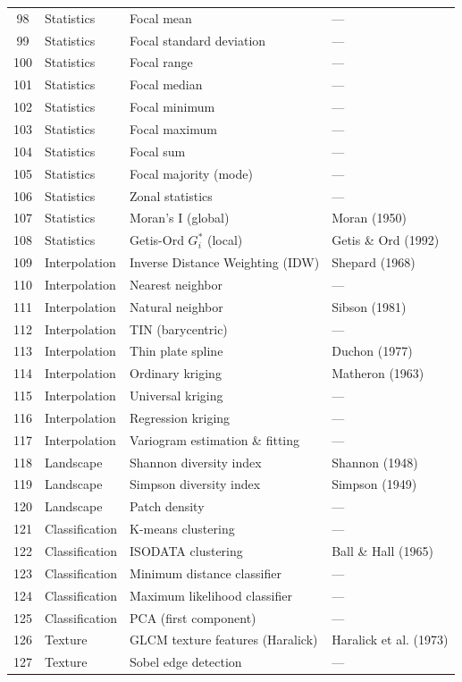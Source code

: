 \documentclass[11pt]{article}
\begin{document}
\begin{longtable}{@{}clp{5.5cm}p{4.5cm}@{}}
98  & Statistics & Focal mean & --- \\
99  & Statistics & Focal standard deviation & --- \\
100 & Statistics & Focal range & --- \\
101 & Statistics & Focal median & --- \\
102 & Statistics & Focal minimum & --- \\
103 & Statistics & Focal maximum & --- \\
104 & Statistics & Focal sum & --- \\
105 & Statistics & Focal majority (mode) & --- \\
106 & Statistics & Zonal statistics & --- \\
107 & Statistics & Moran's I (global) & Moran (1950) \\
108 & Statistics & Getis-Ord $G_i^*$ (local) & Getis \& Ord (1992) \\

109 & Interpolation & Inverse Distance Weighting (IDW) & Shepard (1968) \\
110 & Interpolation & Nearest neighbor & --- \\
111 & Interpolation & Natural neighbor & Sibson (1981) \\
112 & Interpolation & TIN (barycentric) & --- \\
113 & Interpolation & Thin plate spline & Duchon (1977) \\
114 & Interpolation & Ordinary kriging & Matheron (1963) \\
115 & Interpolation & Universal kriging & --- \\
116 & Interpolation & Regression kriging & --- \\
117 & Interpolation & Variogram estimation \& fitting & --- \\

118 & Landscape & Shannon diversity index & Shannon (1948) \\
119 & Landscape & Simpson diversity index & Simpson (1949) \\
120 & Landscape & Patch density & --- \\

121 & Classification & K-means clustering & --- \\
122 & Classification & ISODATA clustering & Ball \& Hall (1965) \\
123 & Classification & Minimum distance classifier & --- \\
124 & Classification & Maximum likelihood classifier & --- \\
125 & Classification & PCA (first component) & --- \\

126 & Texture & GLCM texture features (Haralick) & Haralick et al. (1973) \\
127 & Texture & Sobel edge detection & --- \\

\end{longtable}
\end{document}
